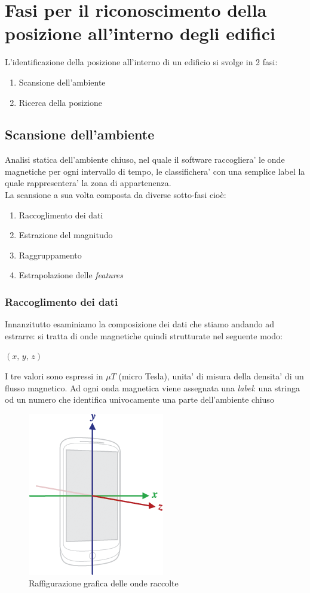 \chapter*{Fasi per il riconoscimento della posizione all'interno degli edifici}
L'identificazione della posizione all'interno di un edificio si svolge in 2 fasi:
\begin{enumerate}
	\item Scansione dell'ambiente
	\item Ricerca della posizione
\end{enumerate}

\section*{Scansione dell'ambiente}
Analisi statica dell'ambiente chiuso, nel quale il software raccogliera' le onde magnetiche per ogni intervallo di tempo, le classifichera' con una semplice label la quale rappresentera' la zona di appartenenza.\\
La scansione a sua volta composta da diverse sotto-fasi cio\`{e}:
\begin{enumerate}
	\item Raccoglimento dei dati
	\item Estrazione del magnitudo
	\item Raggruppamento
	\item Estrapolazione delle \textit{features}
\end{enumerate}
\newpage
\subsection*{Raccoglimento dei dati}
Innanzitutto esaminiamo la composizione dei dati che stiamo andando ad estrarre: si tratta di onde magnetiche quindi strutturate nel seguente modo:\\
\begin{center}
	$(x,\, y,\, z)$
\end{center}
I tre valori sono espressi in $ \mu T $ (micro Tesla), unita' di misura della densita' di un flusso magnetico. Ad ogni onda magnetica viene assegnata una \textit{label}: una stringa od un numero che identifica univocamente una parte dell'ambiente chiuso
\begin{figure}[H]
\centering
\includegraphics[width=0.20\linewidth]{./img/axis_magnetic_field.png}
\caption{Raffigurazione grafica delle onde raccolte}
\label{fig:axis_magnetic_field}
\end{figure}

